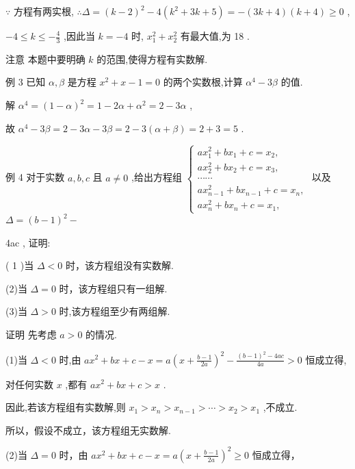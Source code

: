 \documentclass[10pt]{article}
\begin{document}
\(\because\) 方程有两实根, \(\therefore \Delta  = {\left( k - 2\right) }^{2} - 4\left( {{k}^{2} + {3k} + 5}\right)  =  - \left( {{3k} + 4}\right) \left( {k + 4}\right)  \geq  0\) ,

\(- 4 \leq  k \leq   - \frac{4}{3}\) ,因此当 \(k =  - 4\) 时, \({x}_{1}^{2} + {x}_{2}^{2}\) 有最大值,为 18 .

注意 本题中要明确 \(k\) 的范围,使得方程有实数解.

例 3 已知 \(\alpha ,\beta\) 是方程 \({x}^{2} + x - 1 = 0\) 的两个实数根,计算 \({\alpha }^{4} - {3\beta }\) 的值.

解 \({\alpha }^{4} = {\left( 1 - \alpha \right) }^{2} = 1 - {2\alpha } + {\alpha }^{2} = 2 - {3\alpha }\) ,

故 \({\alpha }^{4} - {3\beta } = 2 - {3\alpha } - {3\beta } = 2 - 3\left( {\alpha  + \beta }\right)  = 2 + 3 = 5\) .

例 4 对于实数 \(a,b,c\) 且 \(a \neq  0\) ,给出方程组 \(\left\{  \begin{array}{l} a{x}_{1}^{2} + b{x}_{1} + c = {x}_{2}, \\  a{x}_{2}^{2} + b{x}_{2} + c = {x}_{3}, \\  \cdots \cdots \\  a{x}_{n - 1}^{2} + b{x}_{n - 1} + c = {x}_{n}, \\  a{x}_{n}^{2} + b{x}_{n} + c = {x}_{1}, \end{array}\right.\) 以及 \(\Delta  = {\left( b - 1\right) }^{2} -\)

4ac , 证明:

( 1 )当 \(\Delta  < 0\) 时，该方程组没有实数解.

(2)当 \(\Delta  = 0\) 时，该方程组只有一组解.

(3)当 \(\Delta  > 0\) 时,该方程组至少有两组解.

证明 先考虑 \(a > 0\) 的情况.

(1)当 \(\Delta  < 0\) 时,由 \(a{x}^{2} + {bx} + c - x = a{\left( x + \frac{b - 1}{2a}\right) }^{2} - \frac{{\left( b - 1\right) }^{2} - {4ac}}{4a} > 0\) 恒成立得,

对任何实数 \(x\) ,都有 \(a{x}^{2} + {bx} + c > x\) .

因此,若该方程组有实数解,则 \({x}_{1} > {x}_{n} > {x}_{n - 1} > \cdots  > {x}_{2} > {x}_{1}\) ,不成立.

所以，假设不成立，该方程组无实数解.

(2)当 \(\Delta  = 0\) 时，由 \(a{x}^{2} + {bx} + c - x = a{\left( x + \frac{b - 1}{2a}\right) }^{2} \geq  0\) 恒成立得，
\end{document}
